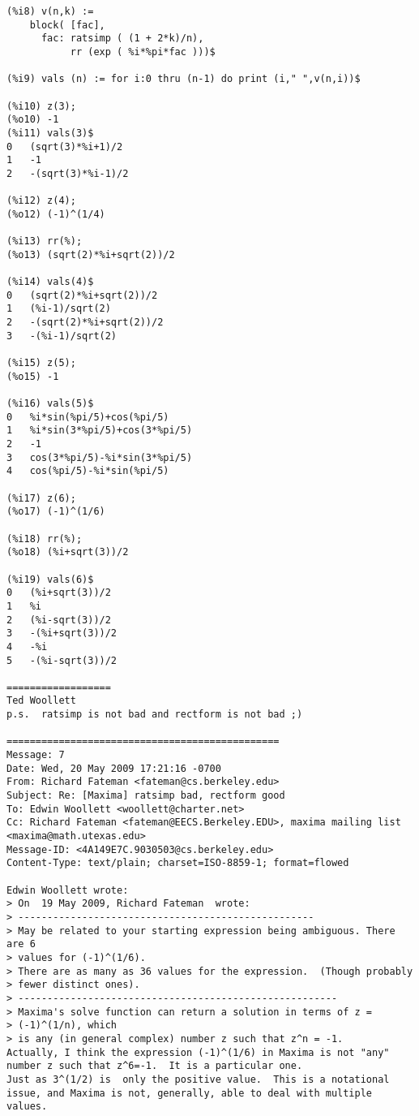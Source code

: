 \documentclass[12pt]{article}
\begin{document}
\begin{verbatim}
(%i8) v(n,k) :=
    block( [fac],
      fac: ratsimp ( (1 + 2*k)/n),
           rr (exp ( %i*%pi*fac )))$

(%i9) vals (n) := for i:0 thru (n-1) do print (i," ",v(n,i))$

(%i10) z(3);
(%o10) -1
(%i11) vals(3)$
0   (sqrt(3)*%i+1)/2
1   -1
2   -(sqrt(3)*%i-1)/2

(%i12) z(4);
(%o12) (-1)^(1/4)

(%i13) rr(%);
(%o13) (sqrt(2)*%i+sqrt(2))/2

(%i14) vals(4)$
0   (sqrt(2)*%i+sqrt(2))/2
1   (%i-1)/sqrt(2)
2   -(sqrt(2)*%i+sqrt(2))/2
3   -(%i-1)/sqrt(2)

(%i15) z(5);
(%o15) -1

(%i16) vals(5)$
0   %i*sin(%pi/5)+cos(%pi/5)
1   %i*sin(3*%pi/5)+cos(3*%pi/5)
2   -1
3   cos(3*%pi/5)-%i*sin(3*%pi/5)
4   cos(%pi/5)-%i*sin(%pi/5)

(%i17) z(6);
(%o17) (-1)^(1/6)

(%i18) rr(%);
(%o18) (%i+sqrt(3))/2

(%i19) vals(6)$
0   (%i+sqrt(3))/2
1   %i
2   (%i-sqrt(3))/2
3   -(%i+sqrt(3))/2
4   -%i
5   -(%i-sqrt(3))/2

==================
Ted Woollett
p.s.  ratsimp is not bad and rectform is not bad ;)

===============================================
Message: 7
Date: Wed, 20 May 2009 17:21:16 -0700
From: Richard Fateman <fateman@cs.berkeley.edu>
Subject: Re: [Maxima] ratsimp bad, rectform good
To: Edwin Woollett <woollett@charter.net>
Cc: Richard Fateman <fateman@EECS.Berkeley.EDU>, maxima mailing list
<maxima@math.utexas.edu>
Message-ID: <4A149E7C.9030503@cs.berkeley.edu>
Content-Type: text/plain; charset=ISO-8859-1; format=flowed

Edwin Woollett wrote:
> On  19 May 2009, Richard Fateman  wrote:
> ---------------------------------------------------
> May be related to your starting expression being ambiguous. There are 6
> values for (-1)^(1/6).
> There are as many as 36 values for the expression.  (Though probably
> fewer distinct ones).
> -------------------------------------------------------
> Maxima's solve function can return a solution in terms of z = 
> (-1)^(1/n), which
> is any (in general complex) number z such that z^n = -1.
Actually, I think the expression (-1)^(1/6) in Maxima is not "any" 
number z such that z^6=-1.  It is a particular one.
Just as 3^(1/2) is  only the positive value.  This is a notational 
issue, and Maxima is not, generally, able to deal with multiple values.


\end{verbatim}
\end{document}
